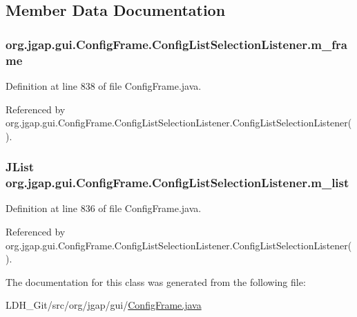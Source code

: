 \subsection{Member Data Documentation}
\hypertarget{classorg_1_1jgap_1_1gui_1_1_config_frame_1_1_config_list_selection_listener_ab913c485a320505f9c88addf2cb75495}{
\subsubsection[{m\-\_\-frame}]{ org.\-jgap.\-gui.\-Config\-Frame.\-Config\-List\-Selection\-Listener.\-m\-\_\-frame\hspace{0.3cm}{\ttfamily [private]}}}\label{classorg_1_1jgap_1_1gui_1_1_config_frame_1_1_config_list_selection_listener_ab913c485a320505f9c88addf2cb75495}


Definition at line 838 of file Config\-Frame.\-java.



Referenced by org.\-jgap.\-gui.\-Config\-Frame.\-Config\-List\-Selection\-Listener.\-Config\-List\-Selection\-Listener().

\hypertarget{classorg_1_1jgap_1_1gui_1_1_config_frame_1_1_config_list_selection_listener_a0c7750e4cf92b8213a4e6835bd3d537f}{
\subsubsection[{m\-\_\-list}]{\setlength{\rightskip}{0pt plus 5cm}J\-List org.\-jgap.\-gui.\-Config\-Frame.\-Config\-List\-Selection\-Listener.\-m\-\_\-list\hspace{0.3cm}{\ttfamily [private]}}}\label{classorg_1_1jgap_1_1gui_1_1_config_frame_1_1_config_list_selection_listener_a0c7750e4cf92b8213a4e6835bd3d537f}


Definition at line 836 of file Config\-Frame.\-java.



Referenced by org.\-jgap.\-gui.\-Config\-Frame.\-Config\-List\-Selection\-Listener.\-Config\-List\-Selection\-Listener().



The documentation for this class was generated from the following file\-:\begin{DoxyCompactItemize}
\item 
L\-D\-H\-\_\-\-Git/src/org/jgap/gui/\hyperlink{_config_frame_8java}{Config\-Frame.\-java}\end{DoxyCompactItemize}
